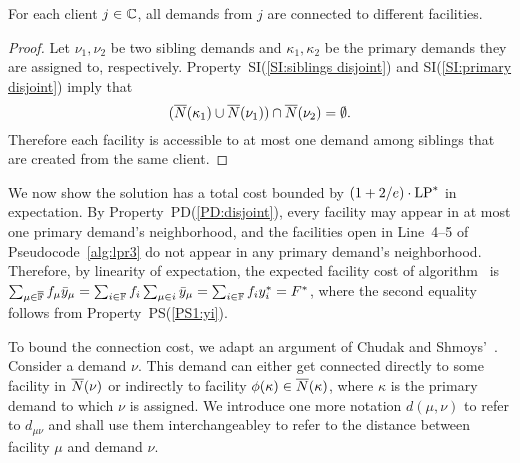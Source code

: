 \documentclass[11pt]{article}
\begin{document}

\begin{lemma}\label{lem: lpr3 feasible}
For each client $j\in\mathbb{C}$, all demands from $j$ are connected to
different facilities.
\end{lemma}


\begin{proof}
  Let $\nu_1,\nu_2$ be two sibling demands and
  $\kappa_1,\kappa_2$ be the primary demands they are
  assigned to, respectively.  Property~SI(\ref{SI:siblings
    disjoint}) and SI(\ref{SI:primary disjoint}) imply that
%
  \begin{equation*}
    ({\overline{N}}(\kappa_1) \cup {\overline{N}}(\nu_1)) \cap {\overline{N}}(\nu_2) = \emptyset.
  \end{equation*}
%
  Therefore each facility is accessible to at most one
  demand among siblings that are created from the same
  client.
\end{proof}


\medskip
We now show the solution has a total cost bounded by
$(1+2/e) \cdot \mbox{\rm LP}^\ast$ in expectation. By
Property~PD(\ref{PD:disjoint}), every facility may appear in at
most one primary demand's neighborhood, and the facilities
open in Line~4--5 of Pseudocode~\ref{alg:lpr3} do not appear
in any primary demand's neighborhood. Therefore, by
linearity of expectation, the expected facility cost of
algorithm~{\ECHU} is $\sum_{\mu\in\overline{\mathbb{F}}}
f_\mu {\bar y}_{\mu} = \sum_{i\in\mathbb{F}} f_i\sum_{\mu\in i}
{\bar y}_{\mu} = \sum_{i\in\mathbb{F}} f_i y_i^\ast = F^\ast$,
where the second equality follows from Property~PS(\ref{PS1:yi}).

To bound the connection cost, we adapt an argument of Chudak
and Shmoys'~\cite{ChudakS04}. Consider a demand $\nu$. This
demand can either get connected directly to some facility in
${\overline{N}}(\nu)$ or indirectly to facility $\phi(\kappa)\in
{\overline{N}}(\kappa)$, where $\kappa$ is the primary demand to
which $\nu$ is assigned. We introduce one more notation
$d(\mu,\nu)$ to refer to $d_{\mu\nu}$ and shall use them
interchangeabley to refer to the distance between facility
$\mu$ and demand $\nu$.
\end{document}
